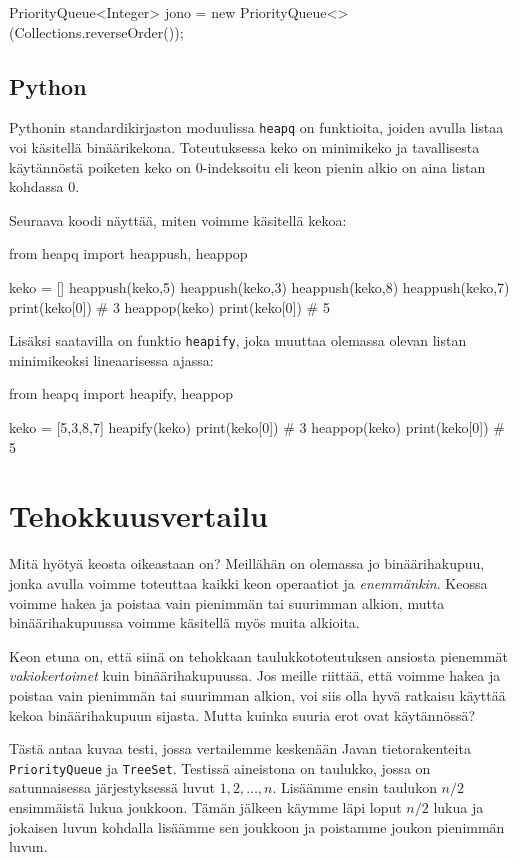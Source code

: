 \begin{code}
PriorityQueue<Integer> jono =
    new PriorityQueue<>(Collections.reverseOrder());
\end{code}

\subsection{Python}

Pythonin standardikirjaston moduulissa \texttt{heapq} on funktioita,
joiden avulla listaa voi käsitellä binäärikekona.
Toteutuksessa keko on minimikeko ja tavallisesta käytännöstä
poiketen keko on 0-indeksoitu eli keon pienin alkio on aina
listan kohdassa 0.

Seuraava koodi näyttää, miten voimme käsitellä kekoa:

\begin{code}
from heapq import heappush, heappop

keko = []
heappush(keko,5)
heappush(keko,3)
heappush(keko,8)
heappush(keko,7)
print(keko[0]) # 3
heappop(keko)
print(keko[0]) # 5
\end{code}

Lisäksi saatavilla on funktio \texttt{heapify},
joka muuttaa olemassa olevan listan minimikeoksi
lineaarisessa ajassa:

\begin{code}
from heapq import heapify, heappop

keko = [5,3,8,7]
heapify(keko)
print(keko[0]) # 3
heappop(keko)
print(keko[0]) # 5
\end{code}

\section{Tehokkuusvertailu}

Mitä hyötyä keosta oikeastaan on?
Meillähän on olemassa jo binäärihakupuu,
jonka avulla voimme toteuttaa kaikki keon operaatiot
ja \emph{enemmänkin}.
Keossa voimme hakea ja poistaa vain pienimmän tai suurimman alkion,
mutta binäärihakupuussa voimme käsitellä myös muita alkioita.

Keon etuna on, että siinä on tehokkaan taulukkototeutuksen
ansiosta pienemmät \emph{vakiokertoimet} kuin binäärihakupuussa.
Jos meille riittää, että voimme hakea ja poistaa
vain pienimmän tai suurimman alkion, voi siis olla hyvä
ratkaisu käyttää kekoa binäärihakupuun sijasta.
Mutta kuinka suuria erot ovat käytännössä?

Tästä antaa kuvaa testi,
jossa vertailemme keskenään Javan tietorakenteita
\texttt{PriorityQueue} ja \texttt{TreeSet}.
Testissä aineistona on taulukko,
jossa on satunnaisessa järjestyksessä luvut $1,2,\dots,n$.
Lisäämme ensin taulukon $n/2$ ensimmäistä lukua joukkoon.
Tämän jälkeen käymme läpi loput $n/2$ lukua
ja jokaisen luvun kohdalla lisäämme sen joukkoon ja
poistamme joukon pienimmän luvun.


